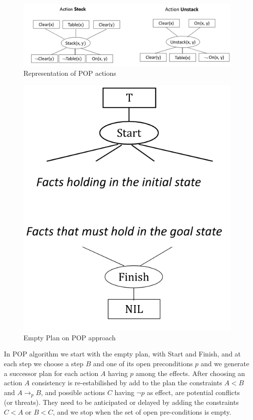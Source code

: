 \begin{figure}
	\includegraphics[width=\textwidth]{Images/popActions}
	\caption{Representation of POP actions}
	\label{img:popActions}
\end{figure}
\begin{figure}
	\includegraphics[width=\textwidth]{Images/emptyPop}
	\caption{Empty Plan on POP approach}
	\label{img:emptyPop}
\end{figure}
In POP algorithm we start with the empty plan, with Start and Finish, and at each step we 
choose a step $B$ and one of its open preconditions $p$ and we generate a successor plan for 
each action $A$ having $p$ among the effects.\newline
After choosing an action $A$ consistency is re-estabilished by add to the plan the constraints 
$A < B$ and $A \to_p B$, and possible actions $C$ having $\neg p$ as effect, are potential 
conflicts (or threats).\newline
They need to be anticipated or delayed by adding the constraints $C < A$ or $B < C$, and we 
stop when the set of open pre-conditions is empty.

